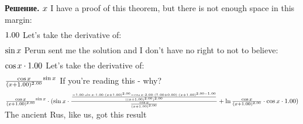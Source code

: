 \documentclass[12pt,a4paper]{extreport}
\theoremstyle{plain}
\theoremstyle{definition}
\newenvironment{solution}%
{\par\noindent\textbf{Решение. }}%
{\bigskip}
\begin{document}
\begin{solution}
\begin{math}
x \\
\end{math}
I have a proof of this theorem, but there is not enough space in this margin: 
\begin{gather}
\end{gather}
\begin{math}
1.00 \\
\end{math}
Let's take the derivative of: 
\begin{gather}
\end{gather}
\begin{math}
\sin x \\
\end{math}
Perun sent me the solution and I don't have no right to not to believe: 
\begin{gather}
\end{gather}
\begin{math}
\cos x \cdot 1.00 \\
\end{math}
Let's take the derivative of: 
\begin{gather}
\end{gather}
\begin{math}
\frac {\cos x }{(x + 1.00 )^ {2.00 }}^ {\sin x }\\
\end{math}
If you're reading this - why?
\begin{gather}
\end{gather}
\begin{math}
\frac {\cos x }{(x + 1.00 )^ {2.00 }}^ {\sin x }\cdot (\sin x \cdot \frac {\frac {-1.00 \cdot \sin x \cdot 1.00 \cdot (x + 1.00 )^ {2.00 }- \cos x \cdot 2.00 \cdot (1.00 + 0.00 )\cdot (x + 1.00 )^ {2.00 - 1.00 }}{((x + 1.00 )^ {2.00 })^ {2.00 }}}{\frac {\cos x }{(x + 1.00 )^ {2.00 }}}+ \ln \frac {\cos x }{(x + 1.00 )^ {2.00 }}\cdot \cos x \cdot 1.00 )\\
\end{math}
The ancient Rus, like us, got this result


\end{solution}
\end{document}
